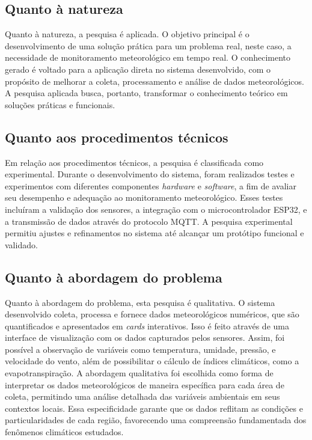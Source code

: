 \subsection{Quanto à natureza}

Quanto à natureza, a pesquisa é aplicada. O objetivo principal é o desenvolvimento de uma solução prática para um problema real, neste caso, a necessidade de monitoramento meteorológico em tempo real. O conhecimento gerado é voltado para a aplicação direta no sistema desenvolvido, com o propósito de melhorar a coleta, processamento e análise de dados meteorológicos. A pesquisa aplicada busca, portanto, transformar o conhecimento teórico em soluções práticas e funcionais.

\subsection{Quanto aos procedimentos técnicos}

Em relação aos procedimentos técnicos, a pesquisa é classificada como experimental. Durante o desenvolvimento do sistema, foram realizados testes e experimentos com diferentes componentes \textit{hardware} e \textit{software}, a fim de avaliar seu desempenho e adequação ao monitoramento meteorológico. Esses testes incluíram a validação dos sensores, a integração com o microcontrolador ESP32, e a transmissão de dados através do protocolo MQTT. A pesquisa experimental permitiu ajustes e refinamentos no sistema até alcançar um protótipo funcional e validado.

\subsection{Quanto à abordagem do problema}

Quanto à abordagem do problema, esta pesquisa é qualitativa. O sistema desenvolvido coleta, processa e fornece dados meteorológicos numéricos, que são quantificados e apresentados em \textit{cards} interativos. Isso é feito através de uma interface de visualização com os dados capturados pelos sensores. Assim, foi possível a observação de variáveis como temperatura, umidade, pressão, e velocidade do vento, além de possibilitar o cálculo de índices climáticos, como a evapotranspiração. A abordagem qualitativa foi escolhida como forma de interpretar os dados meteorológicos de maneira específica para cada área de coleta, permitindo uma análise detalhada das variáveis ambientais em seus contextos locais. Essa especificidade garante que os dados reflitam as condições e particularidades de cada região, favorecendo uma compreensão fundamentada dos fenômenos climáticos estudados.

